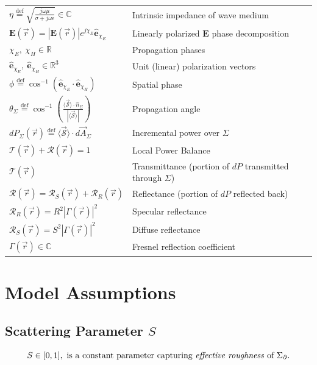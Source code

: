 \documentclass{article}
\begin{document}
\begin{center}
\begin{tabular}{ m{12em} m{25em} }
   $\eta \overset{\text{def}}{=} \sqrt{ \frac{j \omega \mu}{\sigma + j \omega
      \epsilon}} \in \mathbb{C}$ & Intrinsic impedance of wave medium \\
   $\mathbf{E}(\vec{r} ) = |\mathbf{E}( \vec{r} ) | e^{j \chi_E}
      \mathbf{\hat{e}}_{\chi_E}$ & Linearly polarized $\mathbf{E}$ phase
      decomposition \\
   $\chi_E, \ \chi_H \in \mathbb{R}$ & Propagation phases \\
   $\mathbf{\hat{e}}_{\chi_E}, \ \mathbf{\hat{e}}_{\chi_H} \in \mathbb{R}^3$ & Unit
      (linear) polarization vectors \\
   $\phi \overset{\text{def}}{=} \cos^{-1}( \mathbf{\hat{e}}_{\chi_E} \cdot
      \mathbf{\hat{e}}_{\chi_H} )$ & Spatial phase \\
   $\theta_{\Sigma} \overset{\text{def}}{=} \cos^{-1} (\frac{\langle
      \vec{\mathcal{S}} \rangle \cdot \hat{n}_{\Sigma}}{|\langle \vec{\mathcal{S}}
      \rangle |})$ & Propagation angle \\
   $dP_{\Sigma}(\vec{r}) \overset{\text{def}}{=} \langle \vec{\mathcal{S}} \rangle
      \cdot d \vec{A}_{\Sigma}$ & Incremental power over $\Sigma$ \\
      $\mathcal{T}(\vec{r}) + \mathcal{R}(\vec{r}) = 1$ & Local Power Balance \\
   $\mathcal{T}(\vec{r})$ & Transmittance (portion of $dP$ transmitted through
      $\Sigma$) \\
   $\mathcal{R}(\vec{r}) = \mathcal{R}_S(\vec{r}) + \mathcal{R}_R(\vec{r})$ &
      Reflectance (portion of $dP$ reflected back) \\
   $\mathcal{R}_R(\vec{r}) = R^2 |\Gamma(\vec{r})|^2$ & Specular reflectance \\
   $\mathcal{R}_S(\vec{r}) = S^2 |\Gamma(\vec{r})|^2$ & Diffuse reflectance \\
   $\Gamma(\vec{r}) \in \mathbb{C}$ & Fresnel reflection coefficient \\
\end{tabular}
\end{center}

\newpage
\setcounter{section}{0}   %
\setcounter{subsection}{0}
\setcounter{equation}{0}  %
\section{Model Assumptions}
\subsection{Scattering Parameter $S$}
\begin{equation}
   S \in [ 0, 1 ], \text{ is a constant parameter capturing \emph{effective
   roughness} of } \Sigma_{\partial}.
   \label{eq:erParameters}
\end{equation}
\end{document}
